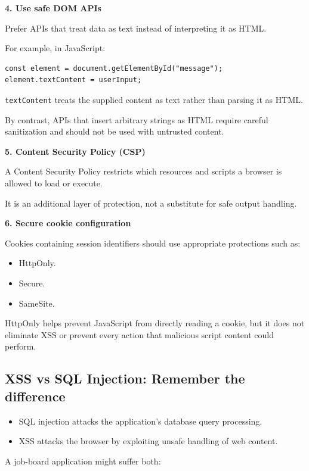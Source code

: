 \textbf{4. Use safe DOM APIs}

Prefer APIs that treat data as text instead of interpreting it as HTML.

For example, in JavaScript:

\begin{lstlisting}
const element = document.getElementById("message");
element.textContent = userInput;
\end{lstlisting}

\texttt{textContent} treats the supplied content as text rather than parsing it as HTML.

By contrast, APIs that insert arbitrary strings as HTML require careful sanitization and should not be used with untrusted content.

\textbf{5. Content Security Policy (CSP)}

A Content Security Policy restricts which resources and scripts a browser is allowed to load or execute.

It is an additional layer of protection, not a substitute for safe output handling.

\textbf{6. Secure cookie configuration}

Cookies containing session identifiers should use appropriate protections such as:

\begin{itemize}
\item HttpOnly.
\item Secure.
\item SameSite.
\end{itemize}

HttpOnly helps prevent JavaScript from directly reading a cookie, but it does not eliminate XSS or prevent every action that malicious script content could perform.

\subsection{XSS vs SQL Injection: Remember the difference}

\begin{itemize}
\item SQL injection attacks the application's database query processing.
\item XSS attacks the browser by exploiting unsafe handling of web content.
\end{itemize}

A job-board application might suffer both:

